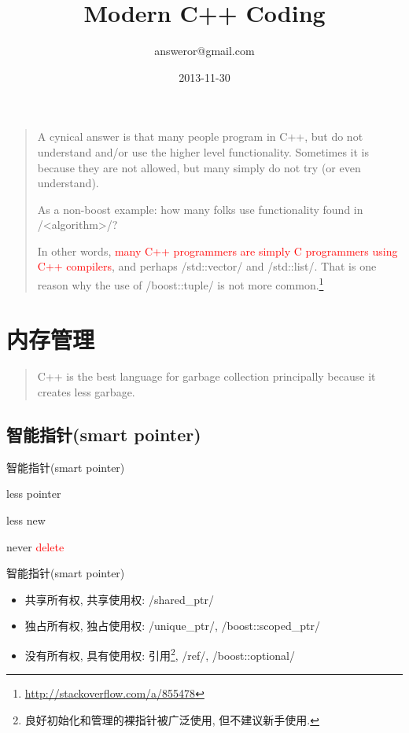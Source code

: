\documentclass[compress]{beamer}
\title{Modern C++ Coding}
\author{answeror@gmail.com}
\date{2013-11-30}
\begin{document}
\frame{\titlepage}

\begin{frame}
    \begin{quote}
        A cynical answer is that many people program in C++, but do not understand and/or use the higher level functionality. Sometimes it is because they are not allowed, but many simply do not try (or even understand).

        As a non-boost example: how many folks use functionality found in /<algorithm>/?

        In other words, \textcolor{red}{many C++ programmers are simply C programmers using C++ compilers}, and perhaps /std::vector/ and /std::list/. That is one reason why the use of /boost::tuple/ is not more common.\footnote{\url{http://stackoverflow.com/a/855478}}
    \end{quote}
\end{frame}

\section{内存管理}

\begin{frame}
    \begin{quote}
        C++ is the best language for garbage collection principally because it creates less garbage.
    \end{quote}
    \vskip5mm
    \hspace*{}
\end{frame}

\newcommand{\smartpointer}{智能指针(smart pointer)}
\subsection{\smartpointer}

\begin{frame}{\smartpointer}
    \begin{center}
        \large less pointer\pause
        
        less new\pause

        never \textcolor{red}{delete}
    \end{center}
\end{frame}

\begin{frame}{\smartpointer}
    \begin{itemize}[<+->]
        \item 共享所有权, 共享使用权: /shared_ptr/
        \item 独占所有权, 独占使用权: /unique_ptr/, /boost::scoped_ptr/
        \item 没有所有权, 具有使用权: 引用\footnote{良好初始化和管理的裸指针被广泛使用, 但不建议新手使用.}, /ref/, /boost::optional/
    \end{itemize}
    \vskip5mm
\end{frame}
\end{document}
